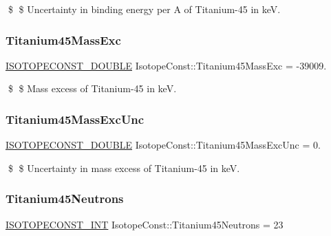 \$ \$ Uncertainty in binding energy per A of Titanium-\/45 in keV. \mbox{\label{group___isotope_const-_titanium-_ti45_gaa9b09c631058959424c82b60f0f2fa1c}} 
\subsubsection{\texorpdfstring{Titanium45\+Mass\+Exc}{Titanium45MassExc}}
{\footnotesize\ttfamily \mbox{\hyperlink{group___isotope_const-_macros_ga8f45a7272ce02c0b4c65c44636ed719a}{I\+S\+O\+T\+O\+P\+E\+C\+O\+N\+S\+T\+\_\+\+D\+O\+U\+B\+LE}} Isotope\+Const\+::\+Titanium45\+Mass\+Exc = -\/39009.}

\$ \$ Mass excess of Titanium-\/45 in keV. \mbox{\label{group___isotope_const-_titanium-_ti45_ga633bdfb9b1dd48e2c3f4def7ad7a4e5e}} 
\subsubsection{\texorpdfstring{Titanium45\+Mass\+Exc\+Unc}{Titanium45MassExcUnc}}
{\footnotesize\ttfamily \mbox{\hyperlink{group___isotope_const-_macros_ga8f45a7272ce02c0b4c65c44636ed719a}{I\+S\+O\+T\+O\+P\+E\+C\+O\+N\+S\+T\+\_\+\+D\+O\+U\+B\+LE}} Isotope\+Const\+::\+Titanium45\+Mass\+Exc\+Unc = 0.}

\$ \$ Uncertainty in mass excess of Titanium-\/45 in keV. \mbox{\label{group___isotope_const-_titanium-_ti45_ga96f933f4380f1677647fd3df0a54759e}} 
\subsubsection{\texorpdfstring{Titanium45\+Neutrons}{Titanium45Neutrons}}
{\footnotesize\ttfamily \mbox{\hyperlink{group___isotope_const-_macros_ga5f18360b3e99483a35c32d789e62621c}{I\+S\+O\+T\+O\+P\+E\+C\+O\+N\+S\+T\+\_\+\+I\+NT}} Isotope\+Const\+::\+Titanium45\+Neutrons = 23}

